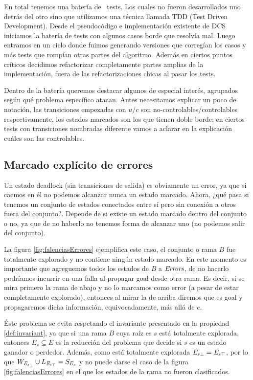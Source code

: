 En total tenemos una batería de \totalTests\ tests. Los cuales no fueron desarrollados uno detrás del otro sino que utilizamos una técnica llamada TDD (Test Driven Development). Desde el pseudocódigo e implementación existente de DCS iniciamos la batería de tests con algunos casos borde que resolvía mal.
Luego entramos en un ciclo donde fuimos generando versiones que corregían los casos y más tests que rompían otras partes del algoritmo. Además en ciertos puntos críticos decidimos refactorizar completamente partes amplias de la implementación, fuera de las refactorizaciones chicas al pasar los tests.

Dentro de la batería queremos destacar algunos de especial interés, agrupados según qué problema específico atacan. Antes necesitamos explicar un poco de notación, las transiciones empezadas con $u$/$c$ son no-controlables/controlables respectivamente, los estados marcados son los que tienen doble borde; en ciertos tests con transiciones nombradas diferente vamos a aclarar en la explicación cuáles son las controlables.
\bigskip

\FloatBarrier
\subsection{Marcado explícito de errores}\label{marcarErrores}

Un estado deadlock (sin transiciones de salida) es obviamente un error, ya que si caemos en él no podemos alcanzar nunca un estado marcado. Ahora, ¿qué pasa si tenemos un conjunto de estados conectados entre sí pero sin conexión a otros fuera del conjunto?. Depende de si existe un estado marcado dentro del conjunto o no, ya que de no haberlo no tenemos forma de alcanzar uno (no podemos salir del conjunto). 

La figura \ref{fig:falenciasErrores} ejemplifica este caso, el conjunto o rama $B$ fue totalmente explorado y no contiene ningún estado marcado. En este momento es importante que agreguemos todos los estados de $B$ a $\mathit{Errors}$, de no hacerlo podríamos incurrir en una falla al propagar goal desde otra rama. Es decir, si se mira primero la rama de abajo y no lo marcamos como error (a pesar de estar completamente explorado), entonces al mirar la de arriba diremos que es goal y propagaremos dicha información, equivocadamente, más allá de $e$. 

Éste problema se evita respetando el invariante presentado en la propiedad \ref{def:invariant}, ya que si una rama $B$ cuya raíz es $s$ está totalmente explorada, entonces $E_s \subseteq E$ es la reducción del problema que decide si $s$ es un estado ganador o perdedor. Además, como está totalmente explorada $\mathit{{E_s}_{\bot}} = \mathit{{E_s}_{\top}}$, por lo que $W_{\mathit{{E_s}_{\bot}}} \cup L_{\mathit{{E_s}_{\top}}} = S_{E_{s}}$ y no puede darse el caso de la figura \ref{fig:falenciasErrores} en el que los estados de la rama no fueron clasificados.

